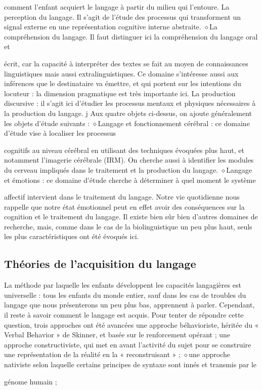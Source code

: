 comment l'enfant acquiert le langage à partir du milieu qui l'entoure.
La perception du langage. Il s’agit de l'étude des processus qui transforment un signal externe
en une représentation cognitive interne abstraite.
\noindent\textcolor{BellaTeal}{$\diamond$}\enspace La compréhension du langage. Il faut distinguer ici la compréhension du langage oral et\par
écrit, car la capacité à interpréter des textes se fait au moyen de connaissances linguistiques
mais aussi extralinguistiques. Ce domaine s'intéresse aussi aux inférences que le destinataire
va émettre, et qui portent sur les intentions du locuteur : la dimension pragmatique est très
importante ici.
La production discursive : il s’agit ici d'étudier les processus mentaux et physiques nécessaires
à la production du langage. j
Aux quatre objets ci-dessus, on ajoute généralement les objets d'étude suivants :
\noindent\textcolor{BellaTeal}{$\diamond$}\enspace Langage et fonctionnement cérébral : ce domaine d'étude vise à localiser les processus\par
cognitifs au niveau cérébral en utilisant des techniques évoquées plus haut, et notamment
l'imagerie cérébrale (IRM). On cherche aussi à identifier les modules du cerveau impliqués
dans le traitement et la production du langage.
\noindent\textcolor{BellaTeal}{$\diamond$}\enspace Langage et émotions : ce domaine d'étude cherche à déterminer à quel moment le système\par
affectif intervient dans le traitement du langage. Notre vie quotidienne nous rappelle que
notre état émotionnel peut en effet avoir des conséquences sur la cognition et le traitement du
langage.
Il existe bien sûr bien d’autres domaines de recherche, mais, comme dans le cas de la
biolinguistique un peu plus haut, seuls les plus caractéristiques ont été évoqués ici.
\subsection{Théories de l’acquisition du langage}
La méthode par laquelle les enfants développent les capacités langagières est universelle : tous les
enfants du monde entier, sauf dans les cas de troubles du langage que nous présenterons un peu plus
bas, apprennent à parler. Cependant, il reste à savoir comment le langage est acquis. Pour tenter de
répondre cette question, trois approches ont été avancées
une approche béhavioriste, héritée du « Verbal Behavior » de Skinner, et basée sur le renforcement
opérant ;
une approche constructiviste, qui met en avant l’activité du sujet pour se construire une
représentation de la réalité en la « reconstruisant » ;
\noindent\textcolor{BellaTeal}{$\diamond$}\enspace une approche nativiste selon laquelle certains principes de syntaxe sont innés et transmis par le\par
génome humain ;


